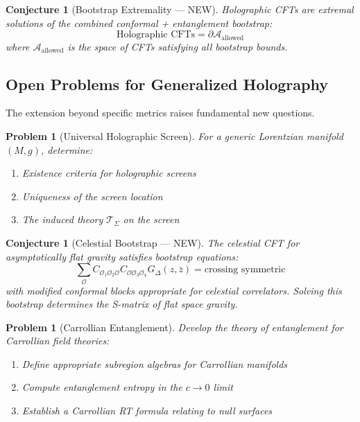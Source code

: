 \documentclass[12pt,a4paper]{article}
\newtheorem{conjecture}[theorem]{Conjecture}
\newtheorem{problem}[theorem]{Problem}
\begin{document}
\begin{conjecture}[Bootstrap Extremality --- NEW]
Holographic CFTs are extremal solutions of the combined conformal + entanglement bootstrap:
\begin{equation}
\text{Holographic CFTs} = \partial \mathcal{A}_{\text{allowed}}
\end{equation}
where $\mathcal{A}_{\text{allowed}}$ is the space of CFTs satisfying all bootstrap bounds.
\end{conjecture}

\subsection{Open Problems for Generalized Holography}

The extension beyond specific metrics raises fundamental new questions.

\begin{problem}[Universal Holographic Screen]
For a generic Lorentzian manifold $(M, g)$, determine:
\begin{enumerate}
    \item Existence criteria for holographic screens
    \item Uniqueness of the screen location
    \item The induced theory $\mathcal{T}_\Sigma$ on the screen
\end{enumerate}
\end{problem}

\begin{conjecture}[Celestial Bootstrap --- NEW]
The celestial CFT for asymptotically flat gravity satisfies bootstrap equations:
\begin{equation}
\sum_{\mathcal{O}} C_{\mathcal{O}_1 \mathcal{O}_2 \mathcal{O}} C_{\mathcal{O} \mathcal{O}_3 \mathcal{O}_4} G_\Delta(z, \bar{z}) = \text{crossing symmetric}
\end{equation}
with modified conformal blocks appropriate for celestial correlators. Solving this bootstrap determines the S-matrix of flat space gravity.
\end{conjecture}

\begin{problem}[Carrollian Entanglement]
Develop the theory of entanglement for Carrollian field theories:
\begin{enumerate}
    \item Define appropriate subregion algebras for Carrollian manifolds
    \item Compute entanglement entropy in the $c \to 0$ limit
    \item Establish a Carrollian RT formula relating to null surfaces
\end{enumerate}
\end{problem}
\end{document}
